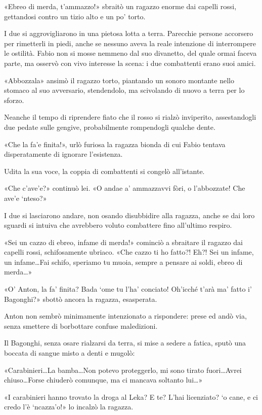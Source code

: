 «Ebreo di merda, t'ammazzo!» sbraitò un ragazzo enorme dai capelli rossi, gettandosi contro un tizio alto e un po' torto.

I due si aggrovigliarono in una pietosa lotta a terra. Parecchie persone accorsero per rimetterli in piedi, anche se nessuno aveva la reale intenzione di interrompere le ostilità. Fabio non si mosse nemmeno dal suo divanetto, del quale ormai faceva parte, ma osservò con vivo interesse la scena: i due combattenti erano suoi amici.

«Abbozzala» ansimò il ragazzo torto, piantando un sonoro montante nello stomaco al suo avversario, stendendolo, ma scivolando di nuovo a terra per lo sforzo.

Neanche il tempo di riprendere fiato che il rosso si rialzò inviperito, assestandogli due pedate sulle gengive, probabilmente rompendogli qualche dente.

«Che la fa'e finita!», urlò furiosa la ragazza bionda di cui Fabio tentava disperatamente di ignorare l'esistenza.

Udita la sua voce, la coppia di combattenti si congelò all'istante.

«Che c'ave'e?» continuò lei. «O andae a' ammazzavvi fòri, o l'abbozzate! Che ave'e `nteso?»

I due si lasciarono andare, non osando disubbidire alla ragazza, anche se dai loro sguardi si intuiva che avrebbero voluto combattere fino all'ultimo respiro.

«Sei un cazzo di ebreo, infame di merda!» cominciò a sbraitare il ragazzo dai capelli rossi, schifosamente ubriaco. «Che cazzo ti ho fatto?! Eh?! Sei un infame, un infame\ldots Fai schifo, speriamo tu muoia, sempre a pensare ai soldi, ebreo di merda\ldots»

«O' Anton, la fa' finita? Bada `ome tu l'ha' conciato! Oh'icché t'arà ma' fatto i' Bagonghi?» sbottò ancora la ragazza, esasperata.

Anton non sembrò minimamente intenzionato a rispondere: prese ed andò via, senza smettere di borbottare confuse maledizioni.

Il Bagonghi, senza osare rialzarsi da terra, si mise a sedere a fatica, sputò una boccata di sangue misto a denti e mugolò:

«Carabinieri\ldots La bamba\ldots Non potevo proteggerlo, mi sono tirato fuori\ldots Avrei chiuso\ldots Forse chiuderò comunque, ma ci mancava soltanto lui\ldots»

«I carabinieri hanno trovato la droga al Leka? E te? L'hai licenziato? `o cane, e ci credo l'è `ncazza'o!» lo incalzò la ragazza.

